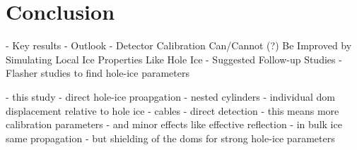 
\section{Conclusion}
\label{sec:conclusion}

- Key results
- Outlook
- Detector Calibration Can/Cannot (?) Be Improved by Simulating Local Ice Properties Like Hole Ice
- Suggested Follow-up Studies
  - Flasher studies to find hole-ice parameters

- this study
- direct hole-ice proapgation
- nested cylinders
- individual dom displacement relative to hole ice
- cables
- direct detection
- this means more calibration parameters
- and minor effects like effective reflection
- in bulk ice same propagation
- but shielding of the doms for strong hole-ice parameters
